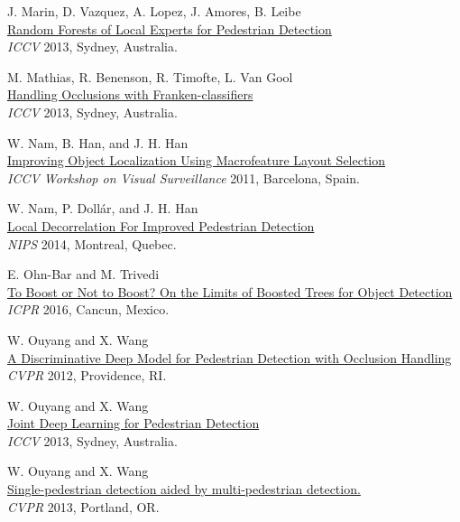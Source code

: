\documentclass[onecolumn]{article}
\begin{document}
\begin{thebibliography}{1}
J. Marin, D. Vazquez, A. Lopez, J. Amores, B. Leibe\\
\href{http://refbase.cvc.uab.es/files/mvl2013b.pdf}{
Random Forests of Local Experts for Pedestrian Detection}\\
\textit{ICCV} 2013, Sydney, Australia.

M. Mathias, R. Benenson, R. Timofte, L. Van Gool\\
\href{http://www.vision.ee.ethz.ch/~timofter/publications/Mathias-ICCV-2013.pdf}{
Handling Occlusions with Franken-classifiers}\\
\textit{ICCV} 2013, Sydney, Australia.

W. Nam, B. Han, and J. H. Han\\
\href{http://home.postech.ac.kr/~xgene/}{
Improving Object Localization Using Macrofeature Layout Selection}\\
\textit{ICCV Workshop on Visual Surveillance} 2011, Barcelona, Spain.

W. Nam, P. Doll\'ar, and J. H. Han\\
\href{http://vision.ucsd.edu/~pdollar/research.html}{
Local Decorrelation For Improved Pedestrian Detection}\\
\textit{NIPS} 2014, Montreal, Quebec.

E. Ohn-Bar and M. Trivedi\\
\href{http://cvrr.ucsd.edu/eshed/papers/boostornot.pdf}{
To Boost or Not to Boost? On the Limits of Boosted Trees for Object Detection}\\
\textit{ICPR} 2016, Cancun, Mexico.

W. Ouyang and X. Wang\\
\href{http://www.ee.cuhk.edu.hk/~wlouyang/projects/ouyangWcvpr12Occ/index.html}{
A Discriminative Deep Model for Pedestrian Detection with Occlusion Handling}\\
\textit{CVPR} 2012, Providence, RI.

W. Ouyang and X. Wang\\
\href{http://www.ee.cuhk.edu.hk/~wlouyang/projects/ouyangWiccv13Joint/index.html}{
Joint Deep Learning for Pedestrian Detection}\\
\textit{ICCV} 2013, Sydney, Australia.

W. Ouyang and X. Wang\\
\href{http://www.ee.cuhk.edu.hk/~wlouyang/projects/ouyangWcvpr13MultiPed/index.html}{
Single-pedestrian detection aided by multi-pedestrian detection.}\\
\textit{CVPR} 2013, Portland, OR.


\end{thebibliography}
\end{document}
